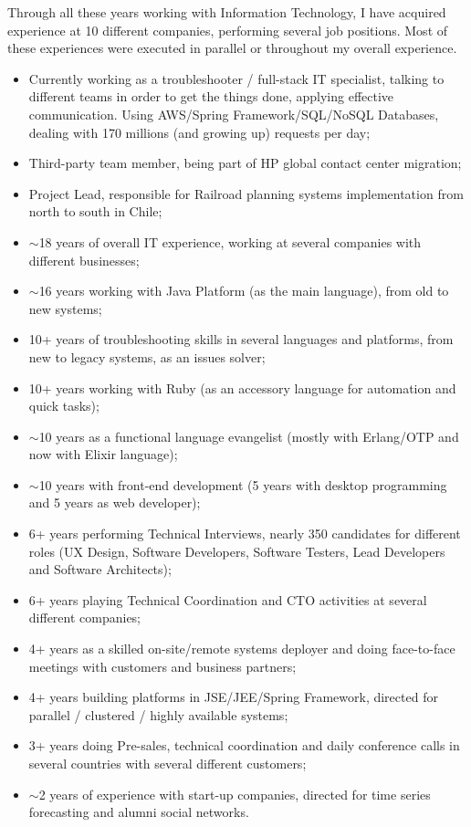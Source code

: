 
\begin{cvparagraph}

Through all these years working with Information Technology, I have acquired experience at 10 different companies, performing several job positions. Most of these experiences were executed in parallel or throughout my overall experience.

\begin{itemize}
\item Currently working as a troubleshooter / full-stack IT specialist, talking to different teams in order to get the things done, applying effective communication. Using AWS/Spring Framework/SQL/NoSQL Databases, dealing with 170 millions (and growing up) requests per day;
\item Third-party team member, being part of HP global contact center migration;
\item Project Lead, responsible for Railroad planning systems implementation from north to south in Chile;
\item $\sim$18 years of overall IT experience, working at several companies with different businesses;
\item $\sim$16 years working with Java Platform (as the main language), from old to new systems;
\item 10+ years of troubleshooting skills in several languages and platforms, from new to legacy systems, as an issues solver;
\item 10+ years working with Ruby  (as an accessory language for automation and quick tasks);
\item $\sim$10 years as a functional language evangelist (mostly with Erlang/OTP and now with Elixir language);
\item $\sim$10 years with front-end development (5 years with desktop programming and 5 years as web developer);
\item 6+ years performing Technical Interviews, nearly 350 candidates for different roles (UX Design, Software Developers, Software Testers, Lead Developers and Software Architects);
\item 6+ years playing Technical Coordination and CTO activities at several different companies;
\item 4+ years as a skilled on-site/remote systems deployer and doing face-to-face meetings with customers and business partners;
\item 4+ years building platforms in JSE/JEE/Spring Framework, directed for parallel / clustered / highly available systems;
\item 3+ years doing Pre-sales, technical coordination and daily conference calls in several countries with several different customers;
\item $\sim$2 years of experience with start-up companies, directed for time series forecasting and alumni social networks. 
\end{itemize}
\end{cvparagraph}


